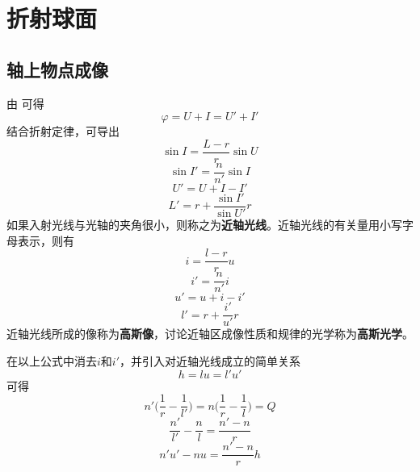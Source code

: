 \documentclass[cn,10pt,chinesefont=founder,math=mtpro2,cite=super,toc=onecol,twoside,openany]{elegantbook}
\begin{document}
\section{折射球面}
\subsection{轴上物点成像}
\label{subsect:paraxial-ray}

由 可得
\begin{equation}
\varphi=U+I=U'+I'
\end{equation}
结合折射定律，可导出
\begin{equation}
\sin I=\frac{L-r}{r}\sin U
\end{equation}
\begin{equation}
\sin I'=\frac{n}{n'}\sin I
\end{equation}
\begin{equation}
U'=U+I-I'
\end{equation}
\begin{equation}
L'=r+\frac{\sin I'}{\sin U'}r
\end{equation}
如果入射光线与光轴的夹角很小，则称之为\textbf{近轴光线}。近轴光线的有关量用小写字母表示，则有
\begin{equation}
i=\frac{l-r}{r}u
\end{equation}
\begin{equation}
i'=\frac{n}{n'}i
\end{equation}
\begin{equation}
u'=u+i-i'
\end{equation}
\begin{equation}
l'=r+\frac{i'}{u'}r
\end{equation}
近轴光线所成的像称为\textbf{高斯像}，讨论近轴区成像性质和规律的光学称为\textbf{高斯光学}。

在以上公式中消去$i$和$i'$，并引入对近轴光线成立的简单关系
\begin{equation}
h=lu=l'u'
\end{equation}
可得
\begin{equation}
n'\bigg(\frac{1}{r}-\frac{1}{l'}\bigg)=n\bigg(\frac{1}{r}-\frac{1}{l}\bigg)=Q
\end{equation}
\begin{equation}
\frac{n'}{l'}-\frac{n}{l}=\frac{n'-n}{r}
\label{eq:spherical-refraction}
\end{equation}
\begin{equation}
n'u'-nu=\frac{n'-n}{r}h
\end{equation}
\end{document}
